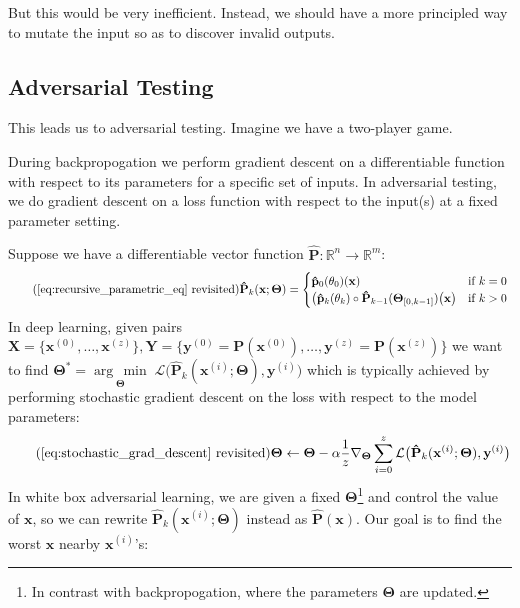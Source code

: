 \documentclass[12pt,initial,twoside,maitrise]{dms}
\newcommand{\argmin}[1]{\underset{#1}{\operatorname{arg}\,\operatorname{min}}\;}
\numberwithin{equation}{section}
\numberwithin{table}{chapter}
\numberwithin{figure}{chapter}
\begin{document}
But this would be very inefficient. Instead, we should have a more principled way to mutate the input so as to discover invalid outputs.

\subsection{Adversarial Testing}

This leads us to adversarial testing. Imagine we have a two-player game.

During backpropogation we perform gradient descent on a differentiable function with respect to its parameters for a specific set of inputs. In adversarial testing, we do gradient descent on a loss function with respect to the input(s) at a fixed parameter setting.

%
\noindent Suppose we have a differentiable vector function $\mathbf{\hat P}: \mathbb{R}^n\rightarrow\mathbb{R}^m$:
%
\begin{equation} \tag{\autoref{eq:recursive_parametric_eq} revisited}
    \mathbf{\hat P}_k(\mathbf{x}; \mathbf{\Theta}) = \begin{cases} \mathbf{\hat p}_0(\mathbf\theta_0)(\mathbf{x}) &\text{if } k=0\\ \big(\mathbf{\hat p}_k(\mathbf\theta_k)\circ \mathbf{\hat P}_{k-1}(\mathbf{\Theta}_{[0, k-1]})\big(\mathbf{x}\big)&\text{if } k > 0 \end{cases} \\
\end{equation}
%
In deep learning, given pairs $\mathbf{X} = \{\mathbf{x}^{(0)}, \dots, \mathbf{x}^{(z)}\}, \mathbf{Y} = \{\mathbf{y}^{(0)} = \mathbf{P}(\mathbf{x}^{(0)}), \dots, \mathbf{y}^{(z)} = \mathbf{P}(\mathbf{x}^{(z)})\}$ we want to find $\mathbf{\Theta}^* = \argmin{\boldsymbol{\Theta}}\mathcal{L}\big(\mathbf{\hat P}_k(\mathbf{x}^{(i)}; \mathbf{\Theta}), \mathbf{y}^{(i)}\big)$ which is typically achieved by performing stochastic gradient descent on the loss with respect to the model parameters:
%
\begin{equation} \tag{\autoref{eq:stochastic_grad_descent} revisited}
    \mathbf\Theta \leftarrow \mathbf\Theta - \alpha\frac{1}{z}\nabla_{\mathbf\Theta} \sum_{i=0}^z\mathcal{L}\big(\mathbf{\hat P}_k(\mathbf{x}^{(i)}; \mathbf{\Theta}), \mathbf{y}^{(i)}\big)
\end{equation}
%
In white box adversarial learning, we are given a fixed $\mathbf \Theta$\footnote{In contrast with backpropogation, where the parameters $\mathbf\Theta$ are updated.} and control the value of $\mathbf x$, so we can rewrite $\mathbf{\hat P}_k(\mathbf{x}^{(i)};\mathbf\Theta)$ instead as $\mathbf{\hat P}(\mathbf x)$. Our goal is to find the worst $\mathbf x$ nearby $\mathbf x^{(i)}$'s:
\end{document}
